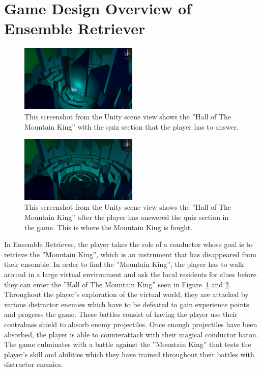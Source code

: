 \section{Game Design Overview of Ensemble Retriever} 
\begin{figure}[tbph]
    \centering
    \includegraphics[width=0.5\textwidth]{figures/screenshots/HallOfTheMountainKingKindaLowRes.png}
    \caption[Screenshot of the ''Hall of The Mountain King'']{This screenshot from the Unity scene view shows the ''Hall of The Mountain King'' with the quiz section that the player has to answer.}
    \label{fig:mkhallWithWall}
\end{figure}

\begin{figure}[tbph]
    \centering
    \includegraphics[width=0.5\textwidth]{figures/screenshots/HallOfTheMountainKing2KindaLowRes.png}
    \caption[Screenshot of the ''Hall of The Mountain King'' Without the Quiz Wall]{This screenshot from the Unity scene view shows the ''Hall of The Mountain King'' after the player has answered the quiz section in the game. This is where the Mountain King is fought.}
    \label{fig:mkhallWithoutWall}
\end{figure}
In Ensemble Retriever, the player takes the role of a conductor whose goal is to retrieve the ''Mountain King'', which is an instrument that has disappeared from their ensemble. In order to find the ''Mountain King'', the player has to walk around in a large virtual environment and ask the local residents for clues before they can enter the ''Hall of The Mountain King'' seen in Figure~\ref{fig:mkhallWithWall} and \ref{fig:mkhallWithoutWall}. Throughout the player's exploration of the virtual world, they are attacked by various distractor enemies which have to be defeated to gain experience points and progress the game. These battles consist of having the player use their contrabass shield to absorb enemy projectiles. Once enough projectiles have been absorbed, the player is able to counterattack with their magical conductor baton. The game culminates with a battle against the ''Mountain King'' that tests the player's skill and abilities which they have trained throughout their battles with distractor enemies.  

